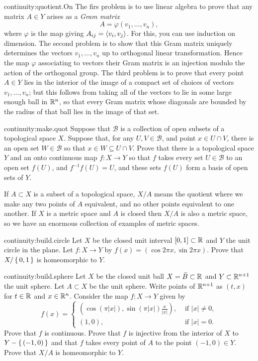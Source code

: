 \begin{answer}{continuity:quotient.On}
The firs problem is to use linear algebra to prove that any matrix \(A\in Y\) arises as a \emph{Gram matrix}
\[
A=\varphi(v_1,\dots,v_n),
\]
where \(\varphi\) is the map giving \(A_{ij}=\left<v_i,v_j\right>\).
For this, you can use induction on dimension.
The second problem is to show that this Gram matrix uniquely determines the vectors \(v_1,\dots,v_n\) up to orthogonal linear transformation.
Hence the map \(\varphi\) associating to vectors their Gram matrix is an injection modulo the action of the orthogonal group.
The third problem is to prove that every point \(A\in Y\) lies in the interior of the image of a compact set of choices of vectors \(v_1,\dots,v_n\); but this follows from taking all of the vectors to lie in some large enough ball in \(\mathbb{R}^{n}\), so that every Gram matrix whose diagonals are bounded by the radius of that ball lies in the image of that set.
\end{answer}
\begin{problem}{continuity:make.quot}
Suppose that \(\mathcal{B}\) is a collection of open subsets of a topological space \(X\).
Suppose that, for any \(U,V\in\mathcal{B}\), and point \(x\in U\cap V\), there is an open set \(W\in\mathcal{B}\) so that \(x\in W\subseteq U\cap V\).
Prove that there is a topological space \(Y\) and an onto continuous map \(f\colon X \to Y\) so that \(f\) takes every set \(U\in\mathcal{B}\) to an open set \(f(U)\), and \(f^{-1}f(U)=U\), and these sets \(f(U)\) form a basis of open sets of \(Y\).
\end{problem}
If \(A \subset X\) is a subset of a topological space, \(X/A\) means the quotient where we make any two points of \(A\) equivalent, and no other points equivalent to one another.
If \(X\) is a metric space and \(A\) is closed then \(X/A\) is also a metric space, so we have an enormous collection of examples of metric spaces.
\begin{problem}{continuity:build.circle}
Let \(X\) be the closed unit interval \([0,1] \subset \mathbb{R}^{}\) and \(Y\) the unit circle in the plane.
Let \(f \colon X \to Y\) by \(f(x)=(\cos 2\pi x, \sin 2\pi x)\).
Prove that \(X/\set{0,1}\) is homeomorphic to \(Y\).
\end{problem}
\begin{problem*}{continuity:build.sphere}
Let \(X\) be the closed unit ball \(X=\bar{B} \subset \mathbb{R}^{}\) and \(Y \subset \mathbb{R}^{n+1}\) the unit sphere.
Let \(A \subset X\) be the unit sphere.
Write points of \(\mathbb{R}^{n+1}\) as \((t,x)\) for \(t \in \mathbb{R}^{}\) and \(x \in \mathbb{R}^{n}\).
Consider the map \(f \colon X \to Y\) given by
\[
f(x)=
\begin{cases}
\left(\cos(\pi |x|), \sin(\pi |x|)\frac{x}{|x|}\right), & \text{ if \(|x|\ne 0\)}, \\
(1,0), & \text{ if \(|x|=0\).}
\end{cases}
\]
Prove that \(f\) is continuous.
Prove that \(f\) is injective from the interior of \(X\) to \(Y-\set{(-1,0)}\) and that \(f\) takes every point of \(A\) to the point \((-1,0) \in Y\).
Prove that \(X/A\) is homeomorphic to \(Y\).
\end{problem*}
